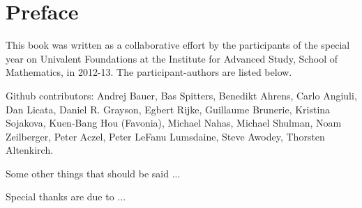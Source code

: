 \chapter*{Preface}
\label{cha:preface}


{%


%

This book was written as a collaborative effort by the participants of the special year on Univalent Foundations at the  Institute for Advanced Study, School of Mathematics, in 2012-13.  The participant-authors are listed below.


Github contributors:
Andrej Bauer,
Bas Spitters,
Benedikt Ahrens,
Carlo Angiuli,
Dan Licata,
Daniel R. Grayson,
Egbert Rijke,
Guillaume Brunerie,
Kristina Sojakova,
Kuen-Bang Hou (Favonia),
Michael Nahas,
Michael Shulman,
Noam Zeilberger,
Peter Aczel,
Peter LeFanu Lumsdaine,
Steve Awodey,
Thorsten Altenkirch.


Some other things that should be said ...

Special thanks are due to ...

\bigskip



}%

